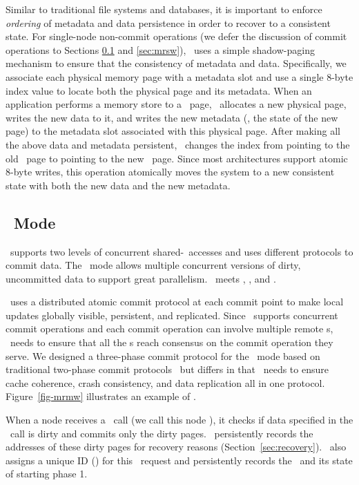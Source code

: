 Similar to traditional file systems and databases, 
it is important to enforce {\em ordering} of metadata and data persistence
in order to recover to a consistent state.
For single-node non-commit operations (we defer the discussion of commit operations to Sections \ref{sec:mrmw} and \ref{sec:mrsw}), 
\hotpot\ uses a simple shadow-paging mechanism to ensure that the consistency of metadata and data.
Specifically, we associate each physical memory page with a metadata slot
and use a single 8-byte index value to locate both the physical page and its metadata.
When an application performs a memory store to a \committed\ page,
\hotpot\ allocates a new physical page, writes the new data to it, and writes the new metadata 
(\eg, the state of the new page) to the metadata slot associated with this physical page.
After making all the above data and metadata persistent, \hotpot\ changes the index
from pointing to the old \committed\ page to pointing to the new \dirty\ page.
Since most architectures support atomic 8-byte writes, this operation atomically moves the system to a new consistent state with both the new data and the new metadata.

\subsection{\mrmw\ Mode}
\label{sec:mrmw}
\hotpot\ supports two levels of concurrent shared-\nvm\ accesses and uses different protocols to commit data.
The \mrmw\ mode allows multiple concurrent versions of dirty, uncommitted data 
to support great parallelism.
\mrmw\ meets \rb, \rcm, and \re.

\mrmw\ uses a distributed atomic commit protocol at each commit point %
to make local updates globally visible, persistent, and replicated.
Since \mrmw\ supports concurrent commit operations 
and each commit operation can involve multiple remote \on{}s,
\hotpot\ needs to ensure that all the \on{}s reach consensus on the commit operation they serve. 
We designed a three-phase commit protocol for the \mrmw\ mode
based on traditional two-phase commit protocols~\cite{Samaras93,Gray78,Lampson81} but differs in that
\hotpot\ needs to ensure cache coherence, crash consistency, and data replication all in one protocol.
Figure~\ref{fig-mrmw} illustrates an example of \mrmw. 



When a node receives a \commitxact\ call (we call this node {\em \xn}), it checks if data specified in the \commitxact\ call is dirty
and commits only the dirty pages.
\xn\ persistently records the addresses of these dirty pages for recovery reasons (Section~\ref{sec:recovery}).
\xn\ also assigns a unique ID ({\em \xactid}) for this \commitxact\ request and persistently records the \xactid\ and its state of starting phase 1. 
 
